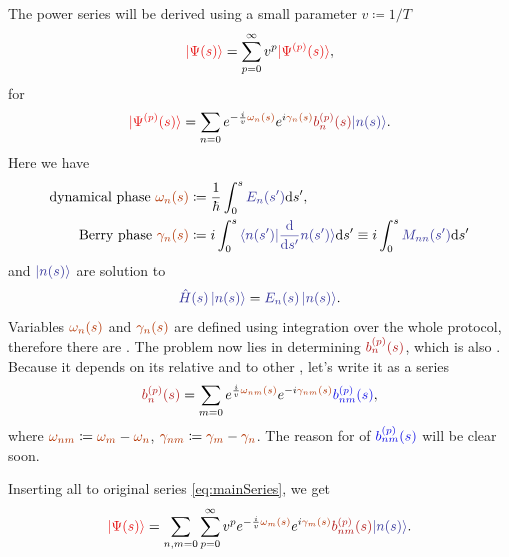 The power series will be derived using a small parameter $v\coloneqq 1/T$
\begin{equation}
    \red{\ket{\Psi(s)}}=\sum_{p=0}^\infty v^p \red{\ket{\Psi^{(p)}(s)}},
    \label{eq:mainSeries}
\end{equation}
for 
\begin{equation}
    \red{\ket{\Psi^{(p)}(s)}}=\sum_{n=0} e^{-\frac{i}{v} \reddd{\omega_n(s)}}e^{i\reddd{\gamma_n(s)}}\redd{b_n^{(p)}(s)}\bluee{\ket{n(s)}}.
\end{equation}
Here we have
\begin{align}
    \text{dynamical phase }\reddd{\omega_n(s)} &\coloneqq \frac{1}{\hbar}\int_0^s \bluee{E_n(s')}\d s',\\
    \text{Berry phase }\reddd{\gamma_n(s)} &\coloneqq i\int_0^s \bluee{\braket{n(s')|\frac{\d}{\d s'}n(s')}}\d s' \equiv i\int_0^s \bluee{M_{nn}(s')}\d s'
    \label{eq:gammadef}
\end{align}
and $\bluee{\ket{n(s)}}$ are solution to
\begin{equation}
    \bluee{\HH(s)\ket{n(s)}}=\bluee{E_n(s) \ket{n(s)}}.
\end{equation}
Variables $\reddd{\omega_n(s)}$ and $\reddd{\gamma_n(s)}$ are defined using integration over the whole protocol, therefore there are \emph{}.
The problem now lies in determining $\redd{b_n^{(p)}(s)}$, which is also . Because it depends on its relative  and  to other , let's write it as a series
\begin{equation}
    \redd{b_n^{(p)}(s)}=\sum_{m=0} e^{\frac{i}{v}\reddd{\omega_{nm}(s)}}e^{-i\reddd{\gamma_{nm}(s)}}\blue{b_{nm}^{(p)}(s)},
    \label{eq:bnAPT}
\end{equation}
where $\reddd{\omega_{nm}} \coloneqq \reddd{\omega_m}-\reddd{\omega_n}$, $\reddd{\gamma_{nm}} \coloneqq \reddd{\gamma_m}-\reddd{\gamma_n}$.  The reason for  of $\blue{b_{nm}^{(p)}(s)}$ will be clear soon.

Inserting all to original series \ref{eq:mainSeries}, we get
\begin{equation}
    \red{\ket{\Psi(s)}}=\sum_{n,m=0}\sum_{p=0}^\infty v^p e^{-\frac{i}{v}\reddd{\omega_m(s)}}e^{i\reddd{\gamma_m(s)}}\redd{b_{nm}^{(p)}(s)}\bluee{\ket{n(s)}}.
    \label{eq:solve0}
\end{equation}

